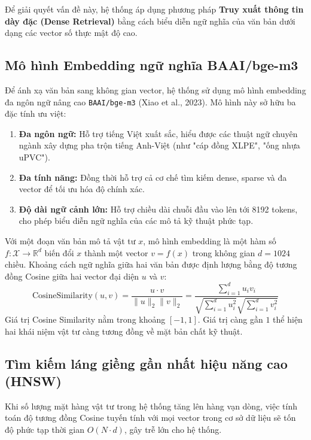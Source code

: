 Để giải quyết vấn đề này, hệ thống áp dụng phương pháp \textbf{Truy xuất thông tin dày đặc (Dense Retrieval)} bằng cách biểu diễn ngữ nghĩa của văn bản dưới dạng các vector số thực mật độ cao.

\subsection{Mô hình Embedding ngữ nghĩa BAAI/bge-m3}

Để ánh xạ văn bản sang không gian vector, hệ thống sử dụng mô hình embedding đa ngôn ngữ nâng cao \texttt{BAAI/bge-m3} (Xiao et al., 2023). Mô hình này sở hữu ba đặc tính ưu việt:
\begin{enumerate}
    \item \textbf{Đa ngôn ngữ:} Hỗ trợ tiếng Việt xuất sắc, hiểu được các thuật ngữ chuyên ngành xây dựng pha trộn tiếng Anh-Việt (như "cáp đồng XLPE", "ống nhựa uPVC").
    \item \textbf{Đa tính năng:} Đồng thời hỗ trợ cả cơ chế tìm kiếm dense, sparse và đa vector để tối ưu hóa độ chính xác.
    \item \textbf{Độ dài ngữ cảnh lớn:} Hỗ trợ chiều dài chuỗi đầu vào lên tới 8192 tokens, cho phép biểu diễn ngữ nghĩa của các mô tả kỹ thuật phức tạp.
\end{enumerate}

Với một đoạn văn bản mô tả vật tư $x$, mô hình embedding là một hàm số $f: \mathcal{X} \to \mathbb{R}^d$ biến đổi $x$ thành một vector $v = f(x)$ trong không gian $d = 1024$ chiều. Khoảng cách ngữ nghĩa giữa hai văn bản được định lượng bằng độ tương đồng Cosine giữa hai vector đại diện $u$ và $v$:
\begin{equation}
    \text{CosineSimilarity}(u, v) = \frac{u \cdot v}{\|u\|_2 \|v\|_2} = \frac{\sum_{i=1}^{d} u_i v_i}{\sqrt{\sum_{i=1}^{d} u_i^2} \sqrt{\sum_{i=1}^{d} v_i^2}}
\end{equation}
Giá trị Cosine Similarity nằm trong khoảng $[-1, 1]$. Giá trị càng gần $1$ thể hiện hai khái niệm vật tư càng tương đồng về mặt bản chất kỹ thuật.

\subsection{Tìm kiếm láng giềng gần nhất hiệu năng cao (HNSW)}

Khi số lượng mặt hàng vật tư trong hệ thống tăng lên hàng vạn dòng, việc tính toán độ tương đồng Cosine tuyến tính với mọi vector trong cơ sở dữ liệu sẽ tốn độ phức tạp thời gian $O(N \cdot d)$, gây trễ lớn cho hệ thống.

